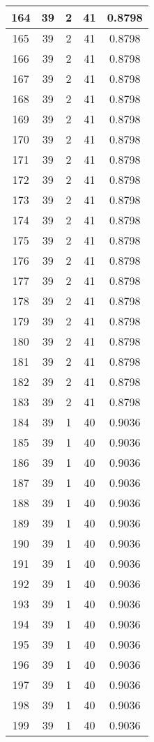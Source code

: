\documentclass[letterpaper, 12pt]{article}
\begin{document}
\begin{longtable}{|c|c|c|c|c|}
\hline
164 & 39 & 2 & 41 & 0.8798 \\
\hline
165 & 39 & 2 & 41 & 0.8798 \\
\hline
166 & 39 & 2 & 41 & 0.8798 \\
\hline
167 & 39 & 2 & 41 & 0.8798 \\
\hline
168 & 39 & 2 & 41 & 0.8798 \\
\hline
169 & 39 & 2 & 41 & 0.8798 \\
\hline
170 & 39 & 2 & 41 & 0.8798 \\
\hline
171 & 39 & 2 & 41 & 0.8798 \\
\hline
172 & 39 & 2 & 41 & 0.8798 \\
\hline
173 & 39 & 2 & 41 & 0.8798 \\
\hline
174 & 39 & 2 & 41 & 0.8798 \\
\hline
175 & 39 & 2 & 41 & 0.8798 \\
\hline
176 & 39 & 2 & 41 & 0.8798 \\
\hline
177 & 39 & 2 & 41 & 0.8798 \\
\hline
178 & 39 & 2 & 41 & 0.8798 \\
\hline
179 & 39 & 2 & 41 & 0.8798 \\
\hline
180 & 39 & 2 & 41 & 0.8798 \\
\hline
181 & 39 & 2 & 41 & 0.8798 \\
\hline
182 & 39 & 2 & 41 & 0.8798 \\
\hline
183 & 39 & 2 & 41 & 0.8798 \\
\hline
184 & 39 & 1 & 40 & 0.9036 \\
\hline
185 & 39 & 1 & 40 & 0.9036 \\
\hline
186 & 39 & 1 & 40 & 0.9036 \\
\hline
187 & 39 & 1 & 40 & 0.9036 \\
\hline
188 & 39 & 1 & 40 & 0.9036 \\
\hline
189 & 39 & 1 & 40 & 0.9036 \\
\hline
190 & 39 & 1 & 40 & 0.9036 \\
\hline
191 & 39 & 1 & 40 & 0.9036 \\
\hline
192 & 39 & 1 & 40 & 0.9036 \\
\hline
193 & 39 & 1 & 40 & 0.9036 \\
\hline
194 & 39 & 1 & 40 & 0.9036 \\
\hline
195 & 39 & 1 & 40 & 0.9036 \\
\hline
196 & 39 & 1 & 40 & 0.9036 \\
\hline
197 & 39 & 1 & 40 & 0.9036 \\
\hline
198 & 39 & 1 & 40 & 0.9036 \\
\hline
199 & 39 & 1 & 40 & 0.9036 \\
\hline
\end{longtable}
\end{document}
